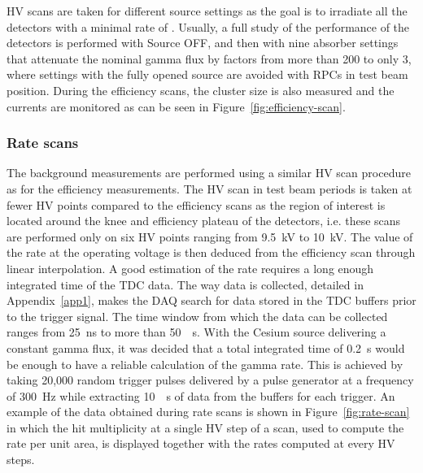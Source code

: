 	HV scans are taken for different source settings as the goal is to irradiate all the detectors with a minimal rate of . Usually, a full study of the performance of the detectors is performed with Source OFF, and then with nine absorber settings that attenuate the nominal gamma flux by factors from more than 200 to only 3, where settings with the fully opened source are avoided with RPCs in test beam position. During the efficiency scans, the cluster size is also measured and the currents are monitored as can be seen in Figure~\ref{fig:efficiency-scan}.
	
\endgroup
	
		\subsubsection{Rate scans}
		\label{chapt5:sssec:ratescan}
		
	The background measurements are performed using a similar HV scan procedure as for the efficiency measurements. The HV scan in test beam periods is taken at fewer HV points compared to the efficiency scans as the region of interest is located around the knee and efficiency plateau of the detectors, i.e. these scans are performed only on six HV points ranging from \SI{9.5}{kV} to \SI{10}{kV}. The value of the rate at the operating voltage is then deduced from the efficiency scan through linear interpolation. A good estimation of the rate requires a long enough integrated time of the TDC data. The way data is collected, detailed in Appendix~\ref{app1}, makes the DAQ search for data stored in the TDC buffers prior to the trigger signal. The time window from which the data can be collected ranges from \SI{25}{ns} to more than \SI{50}{\mu s}. With the Cesium source delivering a constant gamma flux, it was decided that a total integrated time of \SI{0.2}{s} would be enough to have a reliable calculation of the gamma rate. This is achieved by taking 20,000 random trigger pulses delivered by a pulse generator at a frequency of \SI{300}{Hz} while extracting \SI{10}{\mu s} of data from the buffers for each trigger. An example of the data obtained during rate scans is shown in Figure~\ref{fig:rate-scan} in which the hit multiplicity at a single HV step of a scan, used to compute the rate per unit area, is displayed together with the rates computed at every HV steps.
	

